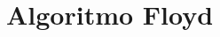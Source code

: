 \section[Algoritmo Floyd]{Algoritmo Floyd}
\begin{frame}[plain]
%	
%	
%			
%		
		
\end{frame}
		
\begin{frame}[plain]
%	
%	
	
\end{frame}	